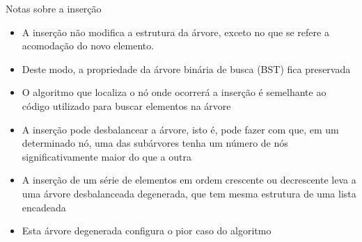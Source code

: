 \begin{frame}[fragile]{Notas sobre a inserção}

	\begin{itemize}
		\item A inserção { não} modifica a estrutura da árvore, { exceto} no que se refere a acomodação do novo elemento.

        \item Deste modo, a propriedade da árvore binária de busca (BST) fica preservada  

		\item O algoritmo que localiza o nó onde ocorrerá a inserção é semelhante ao código 
            utilizado para buscar elementos na árvore

		\item A inserção pode desbalancear a árvore, isto é, pode fazer com que, em um determinado 
            nó, uma das 
            subárvores tenha um número de nós significativamente maior do que a outra

        \item A inserção de um série de elementos em ordem crescente ou decrescente leva a 
            uma árvore desbalanceada degenerada, que tem mesma estrutura de uma lista encadeada

        \item Esta árvore degenerada configura o pior caso do algoritmo
	\end{itemize}

\end{frame}
